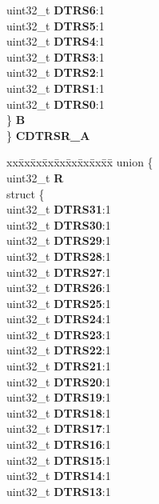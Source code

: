 \begin{DoxyCompactItemize}
\begin{tabbing}
\>\>uint32\_t {\bfseries DTRS6}:1\\
\>\>uint32\_t {\bfseries DTRS5}:1\\
\>\>uint32\_t {\bfseries DTRS4}:1\\
\>\>uint32\_t {\bfseries DTRS3}:1\\
\>\>uint32\_t {\bfseries DTRS2}:1\\
\>\>uint32\_t {\bfseries DTRS1}:1\\
\>\>uint32\_t {\bfseries DTRS0}:1\\
\>\} {\bfseries B}\\
\} {\bfseries CDTRSR\_A}\\

\end{tabbing}\item 
\mbox{\label{structETPU__tag_abd81991d0ca8bc1bcc3a978a6b8a03a2}} 
\begin{tabbing}
xx\=xx\=xx\=xx\=xx\=xx\=xx\=xx\=xx\=\kill
union \{\\
\>uint32\_t {\bfseries R}\\
\>struct \{\\
\>\>uint32\_t {\bfseries DTRS31}:1\\
\>\>uint32\_t {\bfseries DTRS30}:1\\
\>\>uint32\_t {\bfseries DTRS29}:1\\
\>\>uint32\_t {\bfseries DTRS28}:1\\
\>\>uint32\_t {\bfseries DTRS27}:1\\
\>\>uint32\_t {\bfseries DTRS26}:1\\
\>\>uint32\_t {\bfseries DTRS25}:1\\
\>\>uint32\_t {\bfseries DTRS24}:1\\
\>\>uint32\_t {\bfseries DTRS23}:1\\
\>\>uint32\_t {\bfseries DTRS22}:1\\
\>\>uint32\_t {\bfseries DTRS21}:1\\
\>\>uint32\_t {\bfseries DTRS20}:1\\
\>\>uint32\_t {\bfseries DTRS19}:1\\
\>\>uint32\_t {\bfseries DTRS18}:1\\
\>\>uint32\_t {\bfseries DTRS17}:1\\
\>\>uint32\_t {\bfseries DTRS16}:1\\
\>\>uint32\_t {\bfseries DTRS15}:1\\
\>\>uint32\_t {\bfseries DTRS14}:1\\
\>\>uint32\_t {\bfseries DTRS13}:1\\

\end{tabbing}
\end{DoxyCompactItemize}
